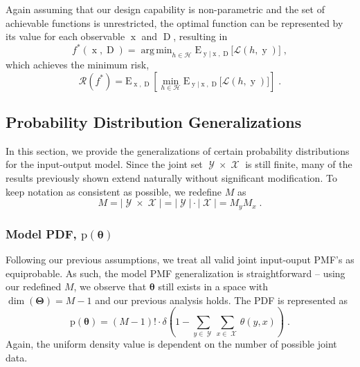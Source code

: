\documentclass[12pt]{report}
\DeclareMathOperator*{\argmin}{arg\,min}
\DeclareMathOperator{\xrm}{\mathrm{x}}
\DeclareMathOperator{\yrm}{\mathrm{y}}
\DeclareMathOperator{\Drm}{\mathrm{D}}
\DeclareMathOperator{\Xcal}{\mathcal{X}}
\DeclareMathOperator{\Ycal}{\mathcal{Y}}
\begin{document}
Again assuming that our design capability is non-parametric and the set of achievable functions is unrestricted, the optimal function can be represented by its value for each observable $\xrm$ and $\Drm$, resulting in
\begin{equation} \label{f_opt_xD}
f^*(\xrm,\Drm) = \argmin_{h \in \mathcal{H}} \text{E}_{\yrm | \xrm,\Drm}\big[ \mathcal{L}(h,\yrm) \big] \;,
\end{equation}
which achieves the minimum risk,
\begin{equation} \label{risk_min_IO}
\mathcal{R}(f^*) = \text{E}_{\xrm,\Drm} \left[ \min_{h \in \mathcal{H}} \text{E}_{\yrm | \xrm,\Drm}\big[ \mathcal{L}(h,\yrm) \big] \right] \;.
\end{equation}



\subsection{Probability Distribution Generalizations}

In this section, we provide the generalizations of certain probability distributions for the input-output model. Since the joint set $\Ycal \times \Xcal$ is still finite, many of the results previously shown extend naturally without significant modification. To keep notation as consistent as possible, we redefine $M$ as
\begin{equation}
M = |\Ycal \times \Xcal| = |\Ycal| \cdot |\Xcal| = M_y M_x \;.
\end{equation} 


\subsubsection{Model PDF, $\text{p}(\bm{\theta})$}

Following our previous assumptions, we treat all valid joint input-ouput PMF's as equiprobable. As such, the model PMF generalization is straightforward -- using our redefined $M$, we observe that $\bm{\theta}$ still exists in a space with $\dim({\bm{\Theta}}) = M-1$ and our previous analysis holds. The PDF is represented as
\begin{equation}
\text{p}(\bm{\theta}) = (M-1)! \cdot \delta \left( 1 - \sum_{y \in \Ycal} \sum_{x \in \Xcal}  \theta(y,x) \right) \;.
\end{equation}
Again, the uniform density value is dependent on the number of possible joint data.
\end{document}
